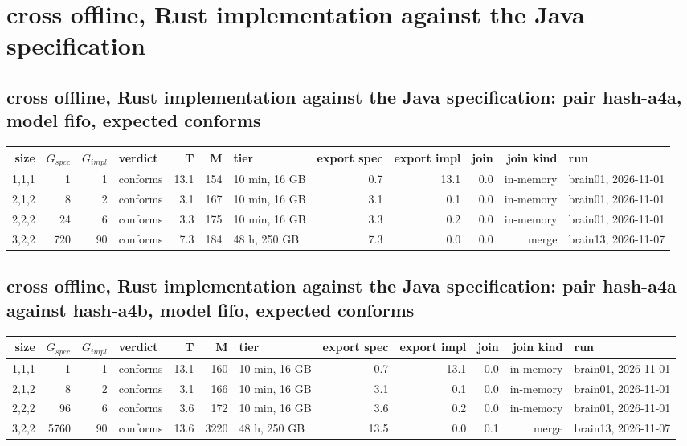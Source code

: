 \documentclass[10pt]{article}
\begin{document}
\section*{cross offline, Rust implementation against the Java specification}
\subsection*{cross offline, Rust implementation against the Java specification: pair \textsf{hash-a4a}, model fifo, expected conforms}
\begin{longtable}{@{}rrrlrrlrrrrl@{}}
\toprule
size & $G_{\mathit{spec}}$ & $G_{\mathit{impl}}$ & verdict & T & M & tier & export spec & export impl & join & join kind & run \\
\midrule
\endhead
\color{red} 1,1,1 & 1 & 1 & conforms & 13.1 & 154 & 10 min, 16 GB & 0.7 & 13.1 & 0.0 & in-memory & brain01, 2026-11-01 \\
\color{red} 2,1,2 & 8 & 2 & conforms & 3.1 & 167 & 10 min, 16 GB & 3.1 & 0.1 & 0.0 & in-memory & brain01, 2026-11-01 \\
\color{red} 2,2,2 & 24 & 6 & conforms & 3.3 & 175 & 10 min, 16 GB & 3.3 & 0.2 & 0.0 & in-memory & brain01, 2026-11-01 \\
\color{red} 3,2,2 & 720 & 90 & conforms & 7.3 & 184 & 48 h, 250 GB & 7.3 & 0.0 & 0.0 & merge & brain13, 2026-11-07 \\
\bottomrule
\end{longtable}
\subsection*{cross offline, Rust implementation against the Java specification: pair \textsf{hash-a4a} against \textsf{hash-a4b}, model fifo, expected conforms}
\begin{longtable}{@{}rrrlrrlrrrrl@{}}
\toprule
size & $G_{\mathit{spec}}$ & $G_{\mathit{impl}}$ & verdict & T & M & tier & export spec & export impl & join & join kind & run \\
\midrule
\endhead
\color{red} 1,1,1 & 1 & 1 & conforms & 13.1 & 160 & 10 min, 16 GB & 0.7 & 13.1 & 0.0 & in-memory & brain01, 2026-11-01 \\
\color{red} 2,1,2 & 8 & 2 & conforms & 3.1 & 166 & 10 min, 16 GB & 3.1 & 0.1 & 0.0 & in-memory & brain01, 2026-11-01 \\
\color{red} 2,2,2 & 96 & 6 & conforms & 3.6 & 172 & 10 min, 16 GB & 3.6 & 0.2 & 0.0 & in-memory & brain01, 2026-11-01 \\
\color{red} 3,2,2 & 5760 & 90 & conforms & 13.6 & 3220 & 48 h, 250 GB & 13.5 & 0.0 & 0.1 & merge & brain13, 2026-11-07 \\
\bottomrule
\end{longtable}
\end{document}
